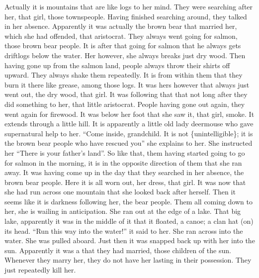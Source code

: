 \begin{pairs}
\begin{Rightside}
Actually it is mountains that are like logs to her mind.
\pend
\pstart
{}They were searching after her, that girl, those townspeople.
Having finished searching arou\-nd, they talked in her absence.
Apparently it was actually the brown bear that married her, which she had offended, that aristocrat.
They always went going for salmon, those brown bear people.
It is after that going for salmon that he always gets driftlogs below the water.
Her however, she always breaks just dry wood.
Then having gone up from the salmon land, people always throw their shirts off upward.
They always shake them repeatedly.
It is from within them that they burn it there like grease, among those logs.
It was hers however that always just went out, the dry wood, that girl.
It was following that that not long after they did something to her, that little aristocrat.
\pend
\pstart
{}People having gone out again, they went again for firewood.
It was below her foot that she saw it, that girl, smoke.
It extends through a little hill.
It is apparently a little old lady deermouse who gave supernatural help to her.
\qqk{}“Come inside, grandchild.
It is not \{unintelligible\};
it is the brown bear people who have rescued you”
she explains to her.
She instructed her “There is your father’s land”.
So like that, them having started going to go for salmon in the morning,
it is in the opposite direction of them that she ran away.
It was having come up in the day that they searched in her absence, the brown bear people.
Here it is all worn out, her dress, that girl.
It was now that she had run across one mountain that she looked back after herself.
Then it seems like it is darkness following her, the bear people.
Them all coming down to her, she is wailing in anticipation.
She ran out at the edge of a lake.
That big lake, apparently it was in the middle of it that it floated, a canoe; a clan hat (on) its head.
\qqk{}“Run this way into the water!” it said to her.
She ran across into the water.
She was pulled aboard.
Just then it was snapped back up with her into the sun.
\pend
\pstart
{}Apparently it was a  that they had married, those children of the sun.
Whenever they marry her, they do not have her lasting in their possession.
They just repeatedly kill her.

\end{Rightside}
\end{pairs}
